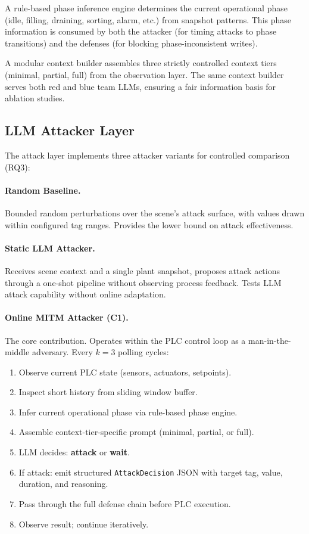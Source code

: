A rule-based phase inference engine determines the current operational phase (idle, filling, draining, sorting, alarm, etc.) from snapshot patterns. This phase information is consumed by both the attacker (for timing attacks to phase transitions) and the defenses (for blocking phase-inconsistent writes).

A modular context builder assembles three strictly controlled context tiers (minimal, partial, full) from the observation layer. The same context builder serves both red and blue team LLMs, ensuring a fair information basis for ablation studies.

\subsection{LLM Attacker Layer}
\label{sec:design:attacker}

The attack layer implements three attacker variants for controlled comparison (RQ3):

\paragraph{Random Baseline.} Bounded random perturbations over the scene's attack surface, with values drawn within configured tag ranges. Provides the lower bound on attack effectiveness.

\paragraph{Static LLM Attacker.} Receives scene context and a single plant snapshot, proposes attack actions through a one-shot pipeline without observing process feedback. Tests LLM attack capability without online adaptation.

\paragraph{Online MITM Attacker (C1).} The core contribution. Operates within the PLC control loop as a man-in-the-middle adversary. Every $k{=}3$ polling cycles:
\begin{enumerate}[leftmargin=2em,nosep]
    \item Observe current PLC state (sensors, actuators, setpoints).
    \item Inspect short history from sliding window buffer.
    \item Infer current operational phase via rule-based phase engine.
    \item Assemble context-tier-specific prompt (minimal, partial, or full).
    \item LLM decides: \textbf{attack} or \textbf{wait}.
    \item If attack: emit structured \texttt{AttackDecision} JSON with target tag, value, duration, and reasoning.
    \item Pass through the full defense chain before PLC execution.
    \item Observe result; continue iteratively.
\end{enumerate}


